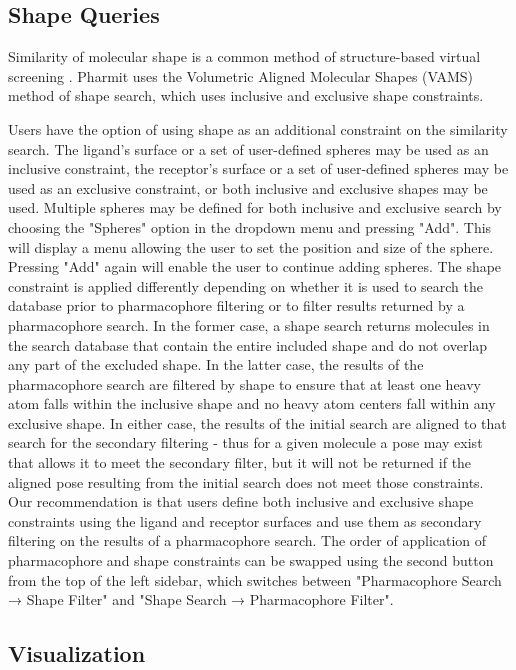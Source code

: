 \subsection{Shape Queries}

Similarity of molecular shape is a common method of structure-based virtual screening \cite{Nicholls_2010}.  Pharmit uses the Volumetric Aligned Molecular Shapes (VAMS) \cite{vams} method of shape search, which uses inclusive and exclusive shape constraints.

\cite{matchpack}\cite{vams}
Users have the option of using shape as an additional constraint on the similarity search. The ligand's surface or a set of user-defined spheres may be used as an inclusive constraint, the receptor's surface or a set of user-defined spheres may be used as an exclusive constraint, or both inclusive and exclusive shapes may be used. Multiple spheres may be defined for both inclusive and exclusive search by choosing the "Spheres" option in the dropdown menu and pressing "Add". This will display a menu allowing the user to set the position and size of the sphere. Pressing "Add" again will enable the user to continue adding spheres. The shape constraint is applied differently depending on whether it is used to search the database prior to pharmacophore filtering or to filter results returned by a pharmacophore search. In the former case, a shape search returns molecules in the search database that contain the entire included shape and do not overlap any part of the excluded shape. In the latter case, the results of the pharmacophore search are filtered by shape to ensure that at least one heavy atom falls within the inclusive shape and no heavy atom centers fall within any exclusive shape. In either case, the results of the initial search are aligned to that search for the secondary filtering - thus for a given molecule a pose may exist that allows it to meet the secondary filter, but it will not be returned if the aligned pose resulting from the initial search does not meet those constraints. Our recommendation is that users define both inclusive and exclusive shape constraints using the ligand and receptor surfaces and use them as secondary filtering on the results of a pharmacophore search. The order of application of pharmacophore and shape constraints can be swapped using the second button from the top of the left sidebar, which switches between "Pharmacophore Search → Shape Filter" and "Shape Search → Pharmacophore Filter".

\subsection{Visualization}

